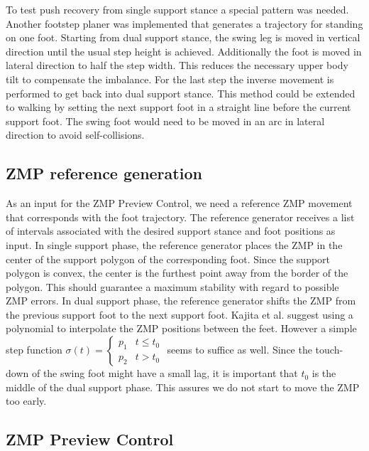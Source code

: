 \documentclass[english,ngerman]{KITreprt}
\begin{document}
To test push recovery from single support stance a special pattern was
needed. Another footstep planer was implemented that generates a
trajectory for standing on one foot. Starting from dual support stance,
the swing leg is moved in vertical direction until the usual step height
is achieved. Additionally the foot is moved in lateral direction to half
the step width. This reduces the necessary upper body tilt to compensate
the imbalance. For the last step the inverse movement is performed to
get back into dual support stance. This method could be extended to
walking by setting the next support foot in a straight line before the
current support foot. The swing foot would need to be moved in an arc in
lateral direction to avoid self-collisions.

\subsection{ZMP reference generation}\label{zmp-reference-generation}

As an input for the ZMP Preview Control, we need a reference ZMP
movement that corresponds with the foot trajectory. The reference
generator receives a list of intervals associated with the desired
support stance and foot positions as input. In single support phase, the
reference generator places the ZMP in the center of the support polygon
of the corresponding foot. Since the support polygon is convex, the
center is the furthest point away from the border of the polygon. This
should guarantee a maximum stability with regard to possible ZMP errors.
In dual support phase, the reference generator shifts the ZMP from the
previous support foot to the next support foot. Kajita et al. suggest
using a polynomial to interpolate the ZMP positions between the feet.
However a simple step function
$\sigma(t) = \left\{\begin{array}{lr}p_1 & t \leq t_0 \\ p_2 & t > t_0 \end{array}\right.$
seems to suffice as well. Since the touch-down of the swing foot might
have a small lag, it is important that $t_0$ is the middle of the dual
support phase. This assures we do not start to move the ZMP too early.

\subsection{ZMP Preview Control}\label{zmp-preview-control}
\end{document}
